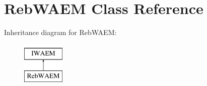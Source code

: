 \hypertarget{class_reb_w_a_e_m}{}\section{Reb\+W\+A\+EM Class Reference}
\label{class_reb_w_a_e_m}
Inheritance diagram for Reb\+W\+A\+EM\+:\begin{figure}[H]
\begin{center}
\leavevmode
\includegraphics[height=2.000000cm]{class_reb_w_a_e_m}
\end{center}
\end{figure}
